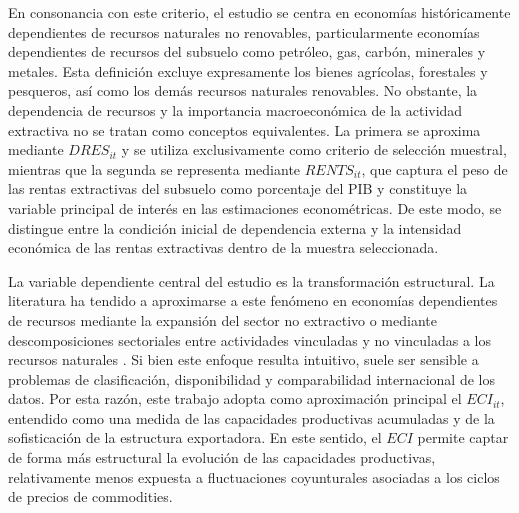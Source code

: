\documentclass[../../TFM.tex]{subfiles}
\begin{document}
En consonancia con este criterio, el estudio se centra en economías
históricamente dependientes de recursos naturales no renovables,
particularmente economías dependientes de recursos del subsuelo como petróleo,
gas, carbón, minerales y metales. Esta definición excluye expresamente los bienes
agrícolas, forestales y pesqueros, así como los demás recursos naturales renovables.
No obstante, la
dependencia de recursos y la importancia macroeconómica de la actividad
extractiva no se tratan como conceptos equivalentes. La primera se
aproxima mediante $DRES_{it}$ y se utiliza exclusivamente como criterio
de selección muestral, mientras que la segunda se representa mediante
$RENTS_{it}$, que captura el peso de las rentas extractivas del subsuelo
como porcentaje del PIB y constituye la variable principal de interés en
las estimaciones econométricas. De este modo, se distingue entre la
condición inicial de dependencia externa y la intensidad económica de las
rentas extractivas dentro de la muestra seleccionada.

La variable dependiente central del estudio es la transformación
estructural. La literatura ha tendido a aproximarse a este fenómeno en
economías dependientes de recursos mediante la expansión del sector no
extractivo o mediante descomposiciones sectoriales entre actividades
vinculadas y no vinculadas a los recursos naturales
\parencite{Lashitew2021}. Si bien este enfoque resulta intuitivo, suele
ser sensible a problemas de clasificación, disponibilidad y
comparabilidad internacional de los datos. Por esta razón, este trabajo
adopta como aproximación principal el $ECI_{it}$, entendido como una medida de las capacidades productivas
acumuladas y de la sofisticación de la estructura exportadora. En este
sentido, el $ECI$ permite captar de forma más estructural la evolución de
las capacidades productivas, relativamente menos expuesta a fluctuaciones
coyunturales asociadas a los ciclos de precios de commodities.
\end{document}
